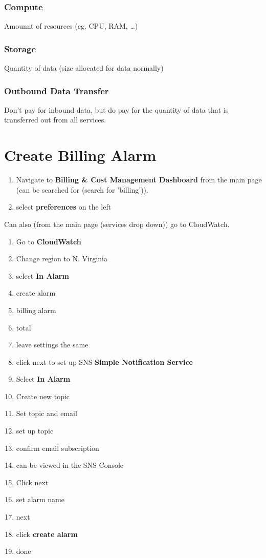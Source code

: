 \documentclass[11pt]{article}
\begin{document}
    \subsubsection{Compute}
    Amounnt of resources (eg. CPU, RAM, \ldots)

    \subsubsection{Storage}
    Quantity of data (size allocated for data normally)


    \subsubsection{Outbound Data Transfer}
    Don't pay for inbound data, but do pay for the quantity of data that is transferred out from all services.

    \section{Create Billing Alarm}
    \begin{enumerate}
        \item Navigate to \textbf{Billing \& Cost Management Dashboard} from the main page (can be searched for (search for 'billing')).
        \item select \textbf{preferences} on the left
    \end{enumerate}
    Can also (from the main page (services drop down)) go to CloudWatch.
    \\
    \begin{enumerate}
        \item Go to \textbf{CloudWatch}
        \item Change region to N. Virginia
        \item select \textbf{In Alarm}
        \item create alarm
        \item billing alarm
        \item total
        \item leave settings the same
        \item click next to set up SNS \textbf{Simple Notification Service}
        \item Select \textbf{In Alarm}
        \item Create new topic
        \item Set topic and email
        \item set up topic
        \item confirm email subscription
        \item can  be viewed in the SNS Console
        \item Click next
        \item set alarm name
        \item next
        \item click \textbf{create alarm}
        \item done
    \end{enumerate}
\end{document}
